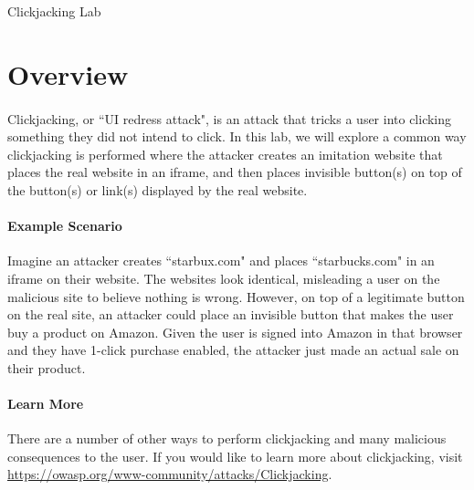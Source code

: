 





\begin{center}
{\LARGE Clickjacking Lab}
\end{center}


\section{Overview}

\paragraph{} Clickjacking, or ``UI redress attack", is an attack that tricks a user into clicking something they did not intend to click. In this lab, we will explore a common way clickjacking is performed where 
 the attacker creates an imitation website that places the real website in an iframe, and then places invisible button(s) on top of the button(s) or link(s) displayed by the real website. 

\paragraph{Example Scenario}
Imagine an attacker creates ``starbux.com" and places ``starbucks.com" in an iframe on their website. The websites look identical, misleading a user on the malicious site to believe nothing is wrong. However, on top of a legitimate button on the real site, an attacker could place an invisible button that makes the user buy a product on Amazon. Given the user is signed into Amazon in that browser and they have 1-click purchase enabled, the attacker just made an actual sale on their product.

\paragraph{Learn More}
There are a number of other ways to perform clickjacking and many malicious consequences to the user. If you would like to learn more about clickjacking, visit \href{https://owasp.org/www-community/attacks/Clickjacking}{https://owasp.org/www-community/attacks/Clickjacking}.




